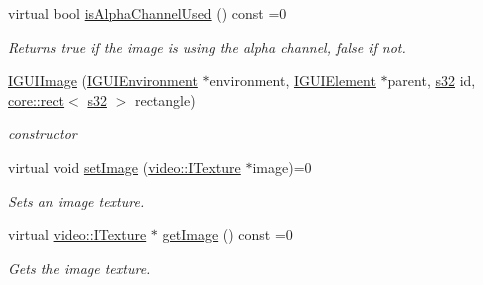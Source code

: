 \begin{DoxyCompactItemize}
virtual bool \hyperlink{classirr_1_1gui_1_1IGUIImage_a5be6faec4c156fc955c84a5b3f703d63}{is\+Alpha\+Channel\+Used} () const =0
\begin{DoxyCompactList}\small\item\em Returns true if the image is using the alpha channel, false if not. \end{DoxyCompactList}\item 
\mbox{\label{classirr_1_1gui_1_1IGUIImage_a079a30cd26c749a8a42b4a689678c4dc}} 
\hyperlink{classirr_1_1gui_1_1IGUIImage_a079a30cd26c749a8a42b4a689678c4dc}{I\+G\+U\+I\+Image} (\hyperlink{classirr_1_1gui_1_1IGUIEnvironment}{I\+G\+U\+I\+Environment} $\ast$environment, \hyperlink{classirr_1_1gui_1_1IGUIElement}{I\+G\+U\+I\+Element} $\ast$parent, \hyperlink{namespaceirr_ac66849b7a6ed16e30ebede579f9b47c6}{s32} id, \hyperlink{classirr_1_1core_1_1rect}{core\+::rect}$<$ \hyperlink{namespaceirr_ac66849b7a6ed16e30ebede579f9b47c6}{s32} $>$ rectangle)
\begin{DoxyCompactList}\small\item\em constructor \end{DoxyCompactList}\item 
\mbox{\label{classirr_1_1gui_1_1IGUIImage_a35a3af4957e42acb183f562d09a4ea63}} 
virtual void \hyperlink{classirr_1_1gui_1_1IGUIImage_a35a3af4957e42acb183f562d09a4ea63}{set\+Image} (\hyperlink{classirr_1_1video_1_1ITexture}{video\+::\+I\+Texture} $\ast$image)=0
\begin{DoxyCompactList}\small\item\em Sets an image texture. \end{DoxyCompactList}\item 
\mbox{\label{classirr_1_1gui_1_1IGUIImage_a5ed7402ca9d9810d320ff11f1251e8c0}} 
virtual \hyperlink{classirr_1_1video_1_1ITexture}{video\+::\+I\+Texture} $\ast$ \hyperlink{classirr_1_1gui_1_1IGUIImage_a5ed7402ca9d9810d320ff11f1251e8c0}{get\+Image} () const =0
\begin{DoxyCompactList}\small\item\em Gets the image texture. \end{DoxyCompactList}\item 
\mbox{\label{classirr_1_1gui_1_1IGUIImage_ac836018aafc61f6b9fe88acfa2267d8e}} 

\end{DoxyCompactItemize}
